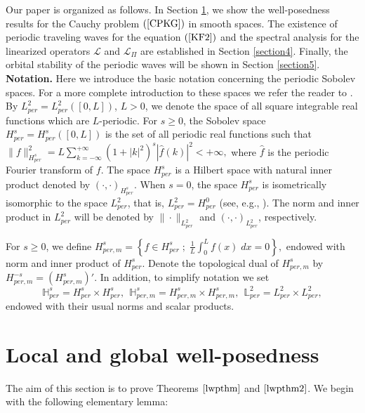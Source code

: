 \documentclass[12pt,reqno,a4paper]{amsart} %
\numberwithin{equation}{section}
\numberwithin{figure}{section}
\begin{document}
Our paper is organized as follows. In Section \ref{section3}, we show the well-posedness results for the Cauchy problem $(\ref{CPKG})$ in smooth spaces. The existence of periodic traveling waves for the equation $(\ref{KF2})$ and the spectral analysis for the linearized operators $\mathcal{L}$ and $\mathcal{L}_{\Pi}$ are established in Section \ref{section4}. Finally, the orbital stability of the periodic waves will be shown in Section \ref{section5}.\\


\textbf{Notation.} Here we introduce the basic notation concerning the periodic Sobolev spaces. For a more complete introduction to these spaces we refer the reader to \cite{Iorio}. By $L^2_{per}=L^2_{per}([0,L])$, $L>0$, we denote the space of all square integrable real functions which are $L$-periodic. For $s\geq0$, the Sobolev space
$H^s_{per}=H^s_{per}([0,L])$
is the set of all periodic real functions such that
$\displaystyle
\|f\|^2_{H^s_{per}}= L\displaystyle \sum_{k=-\infty}^{+\infty}(1+|k|^2)^s|\hat{f}(k)|^2 <+\infty,
$
where $\hat{f}$ is the periodic Fourier transform of $f$. The space $H^s_{per}$ is a  Hilbert space with natural inner product denoted by $(\cdot, \cdot)_{H^s_{per}}$. When $s=0$, the space $H^s_{per}$ is isometrically isomorphic to the space  $L^2_{per}$, that is, $L^2_{per}=H^0_{per}$ (see, e.g., \cite{Iorio}). The norm and inner product in $L^2_{per}$ will be denoted by $\|\cdot \|_{L^2_{per}}$ and $(\cdot, \cdot)_{L^2_{per}}$, respectively. 

For $s \geq 0$, we define
$\displaystyle
	H^s_{per,m} = \left\{ f \in H^s_{per}\; ; \; \frac{1}{L}\int_0^L  f(x) \; dx =0 \right\},
$
endowed with  norm and inner product of $H_{per}^s$. Denote the topological dual of $H^s_{per,m}$ by
$
H^{-s}_{per,m}=(H^s_{per,m})' . 
$
In addition, to simplify notation we set
$$\mathbb{H}^s_{per}= H^s_{per} \times H^s_{per},\ \
\mathbb{H}^s_{per,m}= H^s_{per,m} \times H^s_{per,m},\ \
\mathbb{L}^2_{per}= L^2_{per} \times L^2_{per},$$
endowed with their usual norms and scalar products. 



\section{Local and global well-posedness}\label{section3}

The aim of this section is to prove Theorems $\ref{lwpthm}$ and $\ref{lwpthm2}$. We begin with the following elementary lemma:
\end{document}
